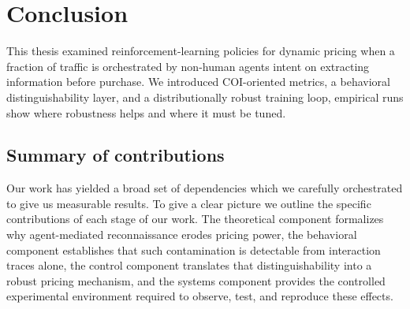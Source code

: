 \section{Conclusion}
\label{sec:conclusion}

This thesis examined reinforcement-learning policies for dynamic pricing when a fraction of traffic is orchestrated by non-human agents intent on extracting information before purchase. We introduced COI-oriented metrics, a behavioral distinguishability layer, and a distributionally robust training loop, empirical runs show where robustness helps and where it must be tuned.

\subsection{Summary of contributions}
Our work has yielded a broad set of dependencies which we carefully orchestrated to give us measurable results. To give a clear picture we outline the specific contributions of each stage of our work. The theoretical component formalizes why agent-mediated reconnaissance erodes pricing power, the behavioral component establishes that such contamination is detectable from interaction traces alone, the control component translates that distinguishability into a robust pricing mechanism, and the systems component provides the controlled experimental environment required to observe, test, and reproduce these effects.

